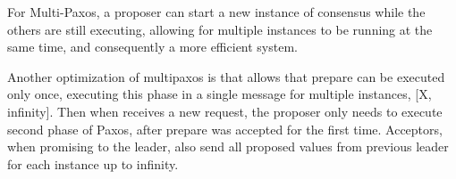 \documentclass[times, 10pt,twocolumn]{article}
\begin{document}
For Multi-Paxos, a proposer can start a new instance of consensus while the 
others are still executing, allowing for multiple instances to be running at the
same time, and consequently a more efficient system.

Another optimization of multipaxos is that allows that prepare can be executed
only once, executing this phase in a single message for multiple instances,
[X, infinity]. Then when receives a new request, the proposer only needs to
execute second phase of Paxos, after prepare was accepted for the first time.
Acceptors, when promising to the leader, also send all proposed values
from previous leader for each instance up to infinity.

\nocite{ex1,ex2}


\end{document}
